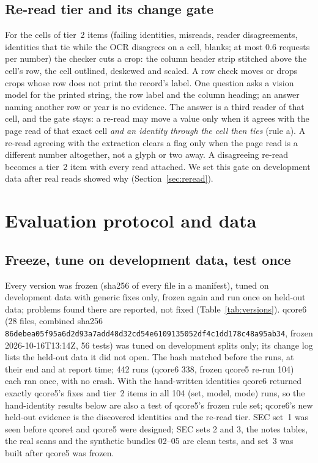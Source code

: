 \documentclass[10pt,twocolumn]{article}
\newcommand{\vq}[1]{\textsf{qcore#1}}
\begin{document}
\subsection{Re-read tier and its change gate}\label{sec:rereadmethod}
For the cells of tier~2 items (failing identities, misreads, reader disagreements, identities that tie while the OCR disagrees on a cell, blanks; at most 0.6 requests per number) the checker cuts a crop: the column header strip stitched above the cell's row, the cell outlined, deskewed and scaled. A row check moves or drops crops whose row does not print the record's label. One question asks a vision model for the printed string, the row label and the column heading; an answer naming another row or year is no evidence. The answer is a third reader of that cell, and the gate stays: a re-read may move a value only when it agrees with the page read of that exact cell \emph{and an identity through the cell then ties} (rule a). A re-read agreeing with the extraction clears a flag only when the page read is a different number altogether, not a glyph or two away. A disagreeing re-read becomes a tier~2 item with every read attached. We set this gate on development data after real reads showed why (Section~\ref{sec:reread}).

\section{Evaluation protocol and data}\label{sec:protocol}

\subsection{Freeze, tune on development data, test once}
Every version was frozen (sha256 of every file in a manifest), tuned on development data with generic fixes only, frozen again and run once on held-out data; problems found there are reported, not fixed (Table~\ref{tab:versions}). \vq{6} (28 files, combined sha256 {\small\nolinkurl{86debea05f95a6d2d93a7add48d32cd54e6109135052df4c1dd178c48a95ab34}}, frozen 2026-10-16T13:14Z, 56 tests) was tuned on development splits only; its change log lists the held-out data it did not open. The hash matched before the runs, at their end and at report time; 442 runs (\vq{6} 338, frozen \vq{5} re-run 104) each ran once, with no crash. With the hand-written identities \vq{6} returned exactly \vq{5}'s fixes and tier~2 items in all 104 (set, model, mode) runs, so the hand-identity results below are also a test of \vq{5}'s frozen rule set; \vq{6}'s new held-out evidence is the discovered identities and the re-read tier. SEC set~1 was seen before \vq{4} and \vq{5} were designed; SEC sets 2 and 3, the notes tables, the real scans and the synthetic bundles 02--05 are clean tests, and set~3 was built after \vq{5} was frozen.
\end{document}
